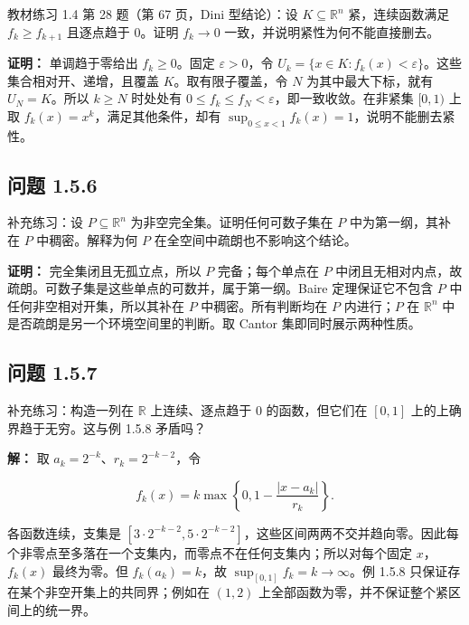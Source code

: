 \documentclass[11pt,a4paper]{article}
\begin{document}
教材练习 1.4 第 28 题（第 67 页，Dini 型结论）：设
\(K\subseteq\mathbb R^n\) 紧，连续函数满足 \(f_k\ge f_{k+1}\) 且逐点趋于
\(0\)。证明 \(f_k\to0\) 一致，并说明紧性为何不能直接删去。

\textbf{证明：} 单调趋于零给出 \(f_k\ge0\)。固定 \(\varepsilon>0\)，令
\(U_k=\{x\in K:f_k(x)<\varepsilon\}\)。这些集合相对开、递增，且覆盖
\(K\)。取有限子覆盖，令 \(N\) 为其中最大下标，就有 \(U_N=K\)。所以
\(k\ge N\) 时处处有
\(0\le f_k\le f_N<\varepsilon\)，即一致收敛。在非紧集 \([0,1)\) 上取
\(f_k(x)=x^k\)，满足其他条件，却有
\(\sup_{0\le x<1}f_k(x)=1\)，说明不能删去紧性。

\subsection{问题 1.5.6}\label{ux95eeux9898-1.5.6}

补充练习：设 \(P\subseteq\mathbb R^n\) 为非空完全集。证明任何可数子集在
\(P\) 中为第一纲，其补在 \(P\) 中稠密。解释为何 \(P\)
在全空间中疏朗也不影响这个结论。

\textbf{证明：} 完全集闭且无孤立点，所以 \(P\) 完备；每个单点在 \(P\)
中闭且无相对内点，故疏朗。可数子集是这些单点的可数并，属于第一纲。Baire
定理保证它不包含 \(P\) 中任何非空相对开集，所以其补在 \(P\)
中稠密。所有判断均在 \(P\) 内进行；\(P\) 在 \(\mathbb R^n\)
中是否疏朗是另一个环境空间里的判断。取 Cantor 集即同时展示两种性质。

\subsection{问题 1.5.7}\label{ux95eeux9898-1.5.7}

补充练习：构造一列在 \(\mathbb R\) 上连续、逐点趋于 \(0\)
的函数，但它们在 \([0,1]\) 上的上确界趋于无穷。这与例 1.5.8 矛盾吗？

\textbf{解：} 取 \(a_k=2^{-k}\)、\(r_k=2^{-k-2}\)，令

\begin{equation*}
f_k(x)=k\max\left\{0,1-\frac{|x-a_k|}{r_k}\right\}.
\tag{1.5.22}
\end{equation*}

各函数连续，支集是
\([3\cdot2^{-k-2},5\cdot2^{-k-2}]\)，这些区间两两不交并趋向零。因此每个非零点至多落在一个支集内，而零点不在任何支集内；所以对每个固定
\(x\)，\(f_k(x)\) 最终为零。但 \(f_k(a_k)=k\)，故
\(\sup_{[0,1]}f_k=k\to\infty\)。例 1.5.8
只保证存在某个非空开集上的共同界；例如在 \((1,2)\)
上全部函数为零，并不保证整个紧区间上的统一界。
\end{document}
